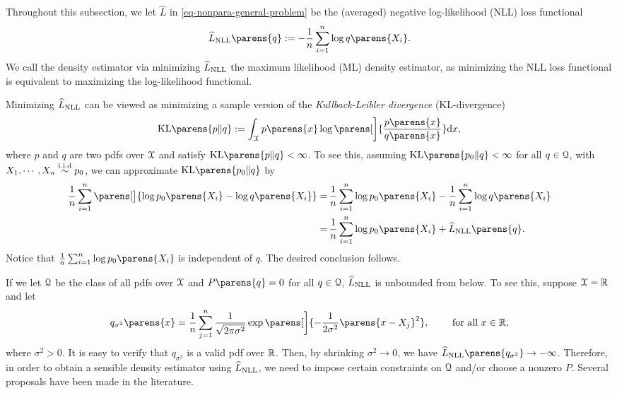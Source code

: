Throughout this subsection, we let $\widehat{L}$ in \eqref{eq-nonpara-general-problem} be the (averaged) negative log-likelihood (NLL) loss functional 
\begin{align}\label{eq-nll-loss-function}
	\widehat{L}_{\NLL} \parens{q} := - \frac{1}{n} \sum_{i=1}^n \log q \parens{X_i}. 
\end{align}
We call the density estimator via minimizing $\widehat{L}_{\mathrm{NLL}}$ the maximum likelihood (ML) density estimator, as minimizing the NLL loss functional is equivalent to maximizing the log-likelihood functional. 

Minimizing $\widehat{L}_{\mathrm{NLL}}$ can be viewed as minimizing a sample version of the \textit{Kullback-Leibler divergence} (KL-divergence) 
\begin{align}
	\KLdiv \parens{p \Vert q} := \int_{\calX} p \parens{x} \log \parens[\bigg]{\frac{p \parens{x}}{q \parens{x}}} \diff x, 
\end{align}
where $p$ and $q$ are two pdfs over $\mathcal{X}$ and satisfy $\KLdiv \parens{p \Vert q} < \infty$. To see this, assuming $\KLdiv \parens{p_0 \Vert q} < \infty$ for all $q \in \mathcal{Q}$, with $X_1, \cdots, X_n \iid p_0$, we can approximate $\KLdiv \parens{p_0 \Vert q}$ by 
\begin{align*}
	\frac{1}{n} \sum_{i=1}^n \parens[\big]{\log p_0 \parens{X_i} - \log q \parens{X_i}} = & \, \frac{1}{n} \sum_{i=1}^n \log p_0 \parens{X_i} - \frac{1}{n} \sum_{i=1}^n \log q \parens{X_i} \\ 
	= & \,  \frac{1}{n} \sum_{i=1}^n \log p_0 \parens{X_i} + \widehat{L}_{\NLL} \parens{q}. 
\end{align*}
Notice that $\frac{1}{n} \sum_{i=1}^n \log p_0 \parens{X_i}$ is independent of $q$. The desired conclusion follows. 

If we let $\mathcal{Q}$ be the class of all pdfs over $\mathcal{X}$ and $P \parens{q} = 0$ for all $q \in \mathcal{Q}$, $\widehat{L}_{\mathrm{NLL}}$ is unbounded from below. To see this, suppose $\mathcal{X} = \mathbb{R}$ and let 
\begin{align*}
	q_{\sigma^2} \parens{x} = \frac{1}{n} \sum_{j=1}^n \frac{1}{\sqrt{2 \pi \sigma^2}} \exp \parens[\bigg]{-\frac{1}{2\sigma^2} \parens{x - X_j}^2}, \qquad \text{ for all } x \in \Real, 
\end{align*}
where $\sigma^2 > 0$. It is easy to verify that $q_{\sigma^2}$ is a valid pdf over $\mathbb{R}$. Then, by shrinking $\sigma^2 \to 0$, we have $\widehat{L}_{\NLL} \parens{q_{\sigma^2}} \to - \infty$. Therefore, in order to obtain a sensible density estimator using $\widehat{L}_{\mathrm{NLL}}$, we need to impose certain constraints on $\mathcal{Q}$ and/or choose a nonzero $P$. Several proposals have been made in the literature. 

